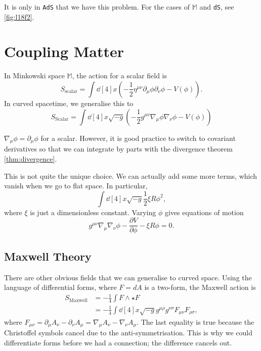 \begin{remark}
  It is only in \texttt{AdS} that we have this problem.
  For the cases of $\mathbb{M}$ and \texttt{dS}, see \ref{fig:l18f2}.
\end{remark}

\section{Coupling Matter}%
\label{sec:coupling_matter}

In Minkowski space $\mathbb{M}$, the action for a scalar field is
\begin{equation}
  S_{\text{scalar}} = \int \dd[4]{x} \left( - \frac{1}{2} \eta^{\mu\nu} \partial_{\mu} \phi \partial_{\nu} \phi - V(\phi) \right).
\end{equation}
In curved spacetime, we generalise this to
\begin{equation}
  S_{\text{Scalar}} = \int \dd[4]{x} \sqrt{-g} \left( - \frac{1}{2} g^{\mu\nu} \nabla_{\mu} \phi \nabla_{\nu} \phi - V(\phi) \right)
\end{equation}
\begin{remark}
  $\nabla_{\mu} \phi = \partial_{\mu} \phi$ for a scalar. However, it is good practice to switch to covariant derivatives so that we can integrate by parts with the divergence theorem \ref{thm:divergence}.
\end{remark}
This is not quite the unique choice. We can actually add some more terms, which vanish when we go to flat space.
In particular, 
\begin{equation}
  \int \dd[4]{x} \sqrt{-g} \frac{1}{2} \xi R \phi^2,
\end{equation}
where $\xi$ is just a dimensionless constant.
Varying $\phi$ gives equations of motion
\begin{equation}
  g^{\mu\nu} \nabla_{\mu} \nabla_{\nu} \phi - \frac{\partial V}{\partial \phi} - \xi R \phi = 0.
\end{equation}

\subsection{Maxwell Theory}%
\label{sub:maxwell_theory}

There are other obvious fields that we can generalise to curved space.
Using the language of differential forms, where $F = d A$ is a two-form, the Maxwell action is
\begin{align}
  S_{\text{Maxwell}} &= -\frac{1}{4} \int F \wedge \star F \\
  &= - \frac{1}{4} \int \dd[4]{x} \sqrt{-g} g^{\mu\rho} g^{\nu\sigma} F_{\mu\nu} F_{\rho\sigma},
\end{align}
where $F_{\mu\nu} = \partial_{\mu} A_{\nu} - \partial_{\nu} A_{\mu} = \nabla_{\mu} A_{\nu} - \nabla_{\nu} A_{\mu}$. The last equality is true because the Christoffel symbols cancel due to the anti-symmetrisation.
This is why we could differentiate forms before we had a connection; the difference cancels out.

